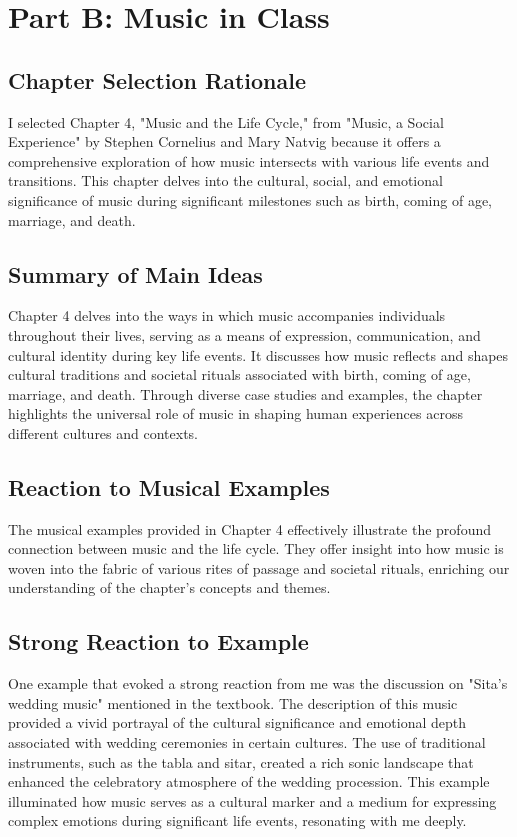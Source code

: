 
\section{Part B: Music in Class}

\subsection{Chapter Selection Rationale}

I selected Chapter 4, "Music and the Life Cycle," from "Music, a Social Experience" by Stephen Cornelius and Mary Natvig\autocite{cornelius_natvig} because it offers a comprehensive exploration of how music intersects with various life events and transitions. This chapter delves into the cultural, social, and emotional significance of music during significant milestones such as birth, coming of age, marriage, and death.

\subsection{Summary of Main Ideas}

Chapter 4 delves into the ways in which music accompanies individuals throughout their lives, serving as a means of expression, communication, and cultural identity during key life events. It discusses how music reflects and shapes cultural traditions and societal rituals associated with birth, coming of age, marriage, and death. Through diverse case studies and examples, the chapter highlights the universal role of music in shaping human experiences across different cultures and contexts.

\subsection{Reaction to Musical Examples}

The musical examples provided in Chapter 4 effectively illustrate the profound connection between music and the life cycle. They offer insight into how music is woven into the fabric of various rites of passage and societal rituals, enriching our understanding of the chapter's concepts and themes.

\subsection{Strong Reaction to Example}

One example that evoked a strong reaction from me was the discussion on "Sita's wedding music" mentioned in the textbook. The description of this music provided a vivid portrayal of the cultural significance and emotional depth associated with wedding ceremonies in certain cultures. The use of traditional instruments, such as the tabla and sitar, created a rich sonic landscape that enhanced the celebratory atmosphere of the wedding procession. This example illuminated how music serves as a cultural marker and a medium for expressing complex emotions during significant life events, resonating with me deeply.

